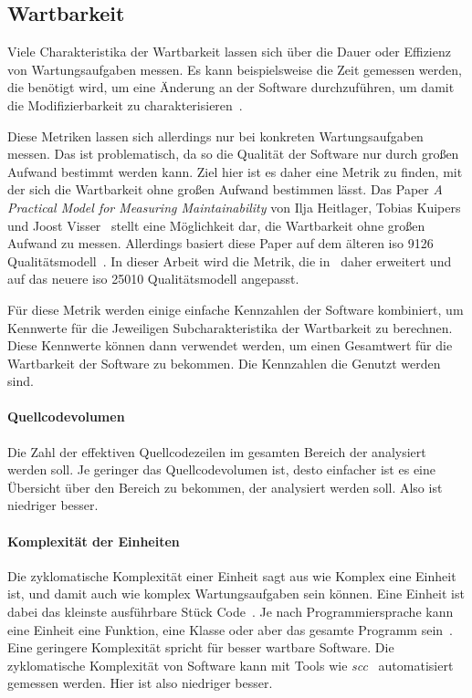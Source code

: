 \documentclass[12pt, a4paper, ngerman]{article}
\begin{document}
\subsection{Wartbarkeit}

Viele Charakteristika der Wartbarkeit lassen sich über die Dauer oder Effizienz von Wartungsaufgaben messen.
Es kann beispielsweise die Zeit gemessen werden, die benötigt wird,
um eine Änderung an der Software durchzuführen,
um damit die Modifizierbarkeit zu charakterisieren~\cite{maintainability_metrics}.%

Diese Metriken lassen sich allerdings nur bei konkreten Wartungsaufgaben messen.
Das ist problematisch, da so die Qualität der Software nur durch großen Aufwand bestimmt werden kann.
Ziel hier ist es daher eine Metrik zu finden, mit der sich die Wartbarkeit ohne großen Aufwand bestimmen lässt.
Das Paper \emph{A Practical Model for Measuring Maintainability} von Ilja Heitlager, Tobias Kuipers und Joost Visser~\cite{maintainability_metrics}
stellt eine Möglichkeit dar, die Wartbarkeit ohne großen Aufwand zu messen.
Allerdings basiert diese Paper auf dem älteren \ac{iso} 9126 Qualitätsmodell~\cite{maintainability_metrics,ISO9126}.
In dieser Arbeit wird die Metrik, die in~\cite{maintainability_metrics} daher erweitert
und auf das neuere \ac{iso} 25010 Qualitätsmodell angepasst.

Für diese Metrik werden einige einfache Kennzahlen der Software kombiniert,
um Kennwerte für die Jeweiligen Subcharakteristika der Wartbarkeit zu berechnen.
Diese Kennwerte können dann verwendet werden, um einen Gesamtwert
für die Wartbarkeit der Software zu bekommen.
Die Kennzahlen die Genutzt werden sind.

\paragraph{Quellcodevolumen}

Die Zahl der effektiven Quellcodezeilen im gesamten Bereich der analysiert werden soll.
Je geringer das Quellcodevolumen ist,
desto einfacher ist es eine Übersicht über den Bereich zu bekommen,
der analysiert werden soll.
Also ist niedriger besser.

\paragraph{Komplexität der Einheiten}

Die zyklomatische Komplexität einer Einheit sagt aus wie Komplex eine Einheit ist,
und damit auch wie komplex Wartungsaufgaben sein können.
Eine Einheit ist dabei das kleinste ausführbare Stück Code~\cite{maintainability_metrics}.
Je nach Programmiersprache kann eine Einheit eine Funktion, eine Klasse oder aber das gesamte Programm sein~\cite{maintainability_metrics}.
Eine geringere Komplexität spricht für besser wartbare Software.
Die zyklomatische Komplexität von Software kann mit Tools
wie \emph{scc}~\cite{scc} automatisiert gemessen werden.
Hier ist also niedriger besser.
\end{document}
